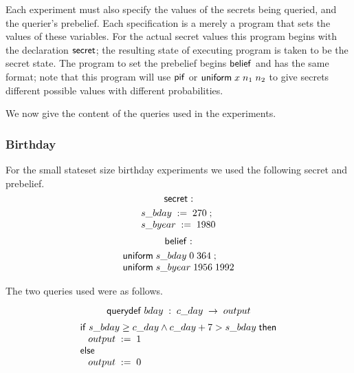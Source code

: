Each experiment must also specify the values of the secrets being
queried, and the querier's prebelief.  Each specification is a merely
a program that sets the values of these variables.  For the actual
secret values this program begins with the declaration $ \mathsf{secret}$;
the resulting state of executing program is taken to be the secret
state.  The program to set the prebelief begins $ \mathsf{belief}$ and has
the same format; note that this program will use $\mathsf{pif}$ or
$\mathsf{uniform}\;{x}\;{n_1}\;n_2$ to give secrets different possible values
with different probabilities.  

We now give the content of the queries used in the experiments.

\subsubsection{Birthday}
For the small stateset size birthday experiments we used the following
secret and prebelief.
$$ \mathsf{secret}: $$
\begin{displaymath}{\small
\begin{array}{l}
  \sassign{s\text{\_}bday}{270}\; ;\\
  \sassign{s\text{\_}byear}{1980}\\
\end{array}
}\end{displaymath}
$$ \mathsf{belief}: $$
\begin{displaymath}{\small
\begin{array}{l}
  \suniform{s\text{\_}bday}{0}{364}\; ;\\
  \suniform{s\text{\_}byear}{1956}{1992}\\
\end{array}
}\end{displaymath}

The two queries used were as follows.

$$ \mathsf{querydef} \; bday \; : \;c\text{\_}day \; \rightarrow \; output$$
\begin{displaymath}{\small
\begin{array}{l}
  \sifk \; \ebinop{\wedge}{\ebinop{\geq}{s\text{\_}bday}{c\text{\_}day}}{\ebinop{>}{\ebinop{+}{c\text{\_}day}{7}}{s\text{\_}bday}} \; \sthenk\\
  \;\;\;\sassign{output}{1}\\
  \selsek\\
  \;\;\;\sassign{output}{0}\\
\end{array}
}\end{displaymath}

